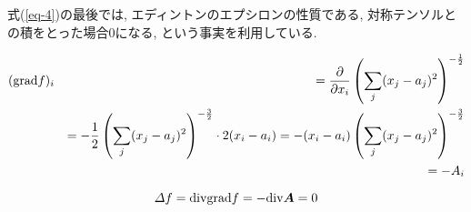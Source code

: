 \documentclass{jsarticle}
\newcommand*{\mbold}[1]{\mbox{\boldmath $#1$}}
\newcommand*{\grad}{{\rm grad}}
\newcommand*{\divg}{{\rm div}}
\begin{document}
式(\ref{eq-4})の最後では, エディントンのエプシロンの性質である, 対称テンソルとの積をとった場合$0$になる, という事実を利用している. 

\begin{eqnarray}
  (\grad f)_i 
  && = \frac{\partial}{\partial x_i}\left( \sum_j (x_j - a_j)^2 \right)^{-\frac{1}{2}} \nonumber \\
  && = -\frac{1}{2} \left( \sum_j (x_j - a_j)^2 \right)^{-\frac{3}{2}} \cdot 2(x_i - a_i)
  = -(x_i - a_i)\left( \sum_j (x_j - a_j)^2 \right)^{-\frac{3}{2}} \nonumber \\
  && = -A_i
\end{eqnarray}

\begin{equation}
  \varDelta f = \divg \grad f = -\divg \mbold{A} = 0
\end{equation}
\end{document}
